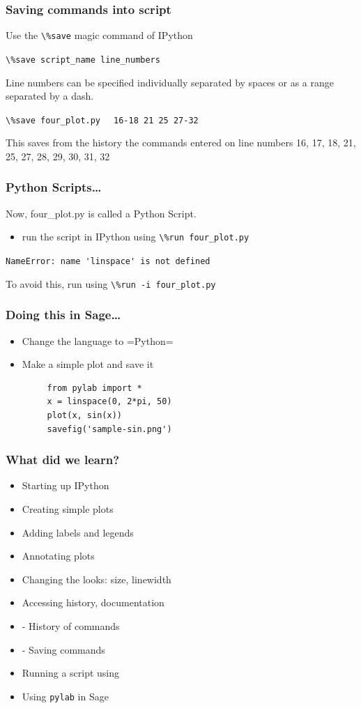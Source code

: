\documentclass[14pt,compress]{beamer}
\newcommand{\typ}[1]{\lstinline{#1}}
\newcommand{\kwrd}[1]{ \texttt{\textbf{\color{blue}{#1}}}  }
\begin{document}
\begin{frame}[fragile]
  \frametitle{Saving commands into script}
Use the \typ{\%save} \alert{magic} command of IPython
\begin{block}{}
\typ{\%save script_name line_numbers}
\end{block}
Line numbers can be specified individually separated by spaces or as a range separated by a dash.\\
\begin{block}{}
\typ{\%save four_plot.py} \alert{\typ{  16-18 21 25 27-32}} \\  
\end{block}
This saves from the history the commands entered on line numbers \alert{16, 17, 18, 21, 25, 27, 28, 29, 30, 31, 32}
\end{frame}

\begin{frame}
\frametitle{Python Scripts\ldots}
Now, four\_plot.py is called a Python Script.
 \begin{itemize}
 \item run the script in IPython using \typ{\%run four_plot.py}\\
 \end{itemize}
\pause
\alert{\typ{NameError: name 'linspace' is not defined}}
\begin{block}{}
To avoid this, run using \alert{\typ{\%run -i four_plot.py}}\\
\end{block}
\end{frame}

\begin{frame}[fragile]
\frametitle{Doing this in Sage\ldots}
 \begin{itemize}
 \item Change the language to =Python= 
 \item Make a simple plot and save it
   \begin{lstlisting}
     from pylab import *
     x = linspace(0, 2*pi, 50)
     plot(x, sin(x))
     savefig('sample-sin.png')
   \end{lstlisting}
 \end{itemize}
\end{frame}

\begin{frame}[fragile]
  \frametitle{What did we learn?}
  \begin{itemize}
    \item Starting up IPython
    \item Creating simple plots
    \item Adding labels and legends
    \item Annotating plots
    \item Changing the looks: size, linewidth
    \item Accessing history, documentation
    \item \kwrd{\%hist} - History of commands
    \item \kwrd{\%save} - Saving commands 
    \item Running a script using \kwrd{\%run -i}
    \item Using \lstinline|pylab| in Sage
  \end{itemize}
\end{frame}
\end{document}
